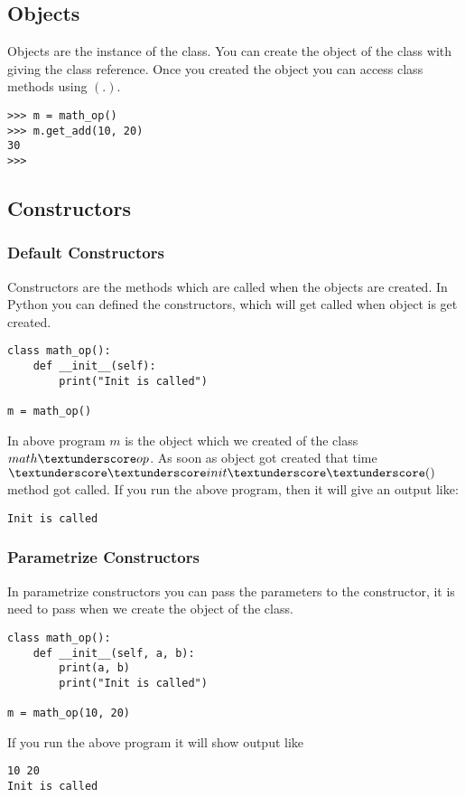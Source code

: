 \documentclass[letterpaper,12pt]{book}
\begin{document}
\subsection{Objects}
Objects are the instance of the class. You can create the object of the class with giving the class reference. Once you created the object you can access class methods using $(.)$.

\begin{lstlisting}
>>> m = math_op()
>>> m.get_add(10, 20)
30
>>>
\end{lstlisting}
\subsection{Constructors}
\subsubsection{Default Constructors}
Constructors are the methods which are called when the objects are created. In Python you can defined the constructors, which will get called when object is get created.

\begin{lstlisting}
class math_op():
    def __init__(self):
        print("Init is called")

m = math_op()
\end{lstlisting}
In above program $m$ is the object which we created of the class $math \textunderscore op$. As soon as object got created that time $\textunderscore\textunderscore init\textunderscore\textunderscore()$ method got called. 
If you run the above program, then it will give an output like:
\begin{lstlisting}
Init is called
\end{lstlisting}
\subsubsection{Parametrize Constructors}
In parametrize constructors you can pass the parameters to the constructor, it is need to pass when we create the object of the class.

\begin{lstlisting}
class math_op():
    def __init__(self, a, b):
        print(a, b)
        print("Init is called")
		
m = math_op(10, 20)
\end{lstlisting}
If you run the above program it will show output like
\begin{lstlisting}
10 20
Init is called
\end{lstlisting}
\end{document}
